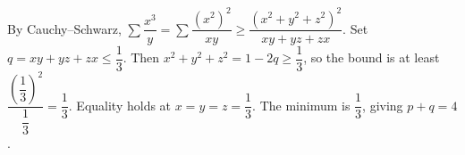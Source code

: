 By Cauchy--Schwarz, $\sum \dfrac{x^3}{y}=\sum \dfrac{(x^2)^2}{xy}\ge\dfrac{(x^2+y^2+z^2)^2}{xy+yz+zx}$. Set $q=xy+yz+zx\le \dfrac{1}{3}$. Then $x^2+y^2+z^2=1-2q\ge \dfrac{1}{3}$, so the bound is at least $\dfrac{(\dfrac{1}{3})^2}{\dfrac{1}{3}}=\dfrac{1}{3}$. Equality holds at $x=y=z=\dfrac{1}{3}$. The minimum is $\dfrac{1}{3}$, giving $\boxed{p+q=4}$.
